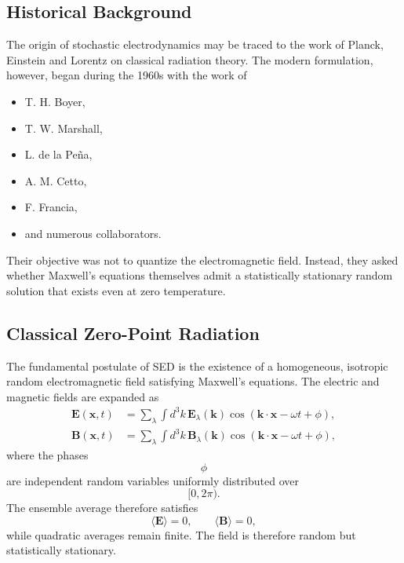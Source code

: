 \subsection{Historical Background}
The origin of stochastic electrodynamics may be traced to the work of
Planck, Einstein and Lorentz on classical radiation theory.
The modern formulation, however, began during the 1960s with the work of
\begin{itemize}
\item T. H. Boyer,
\item T. W. Marshall,
\item L. de la Peña,
\item A. M. Cetto,
\item F. Francia,
\item and numerous collaborators.
\end{itemize}
Their objective was not to quantize the electromagnetic field.
Instead,
they asked whether Maxwell's equations themselves admit a statistically
stationary random solution that exists even at zero temperature.
\subsection{Classical Zero-Point Radiation}
The fundamental postulate of SED is the existence of a homogeneous,
isotropic random electromagnetic field satisfying Maxwell's equations.
The electric and magnetic fields are expanded as
\begin{align}
\mathbf E(\mathbf x,t)&=\sum_{\lambda}\int d^3k\,
\mathbf E_{\lambda}(\mathbf k)\cos(\mathbf k\cdot\mathbf x-\omega t+\phi),\\
\mathbf B(\mathbf x,t)&=\sum_{\lambda}\int d^3k\,
\mathbf B_{\lambda}(\mathbf k)\cos(\mathbf k\cdot\mathbf x-\omega t+\phi),
\end{align}
where the phases
\[\phi\]
are independent random variables uniformly distributed over
\[[0,2\pi).\]
The ensemble average therefore satisfies
\[\langle\mathbf E\rangle=0,\qquad\langle\mathbf B\rangle=0,\]
while quadratic averages remain finite.
The field is therefore random but statistically stationary.
